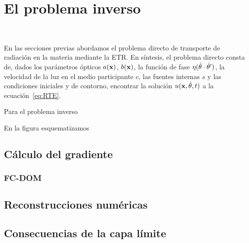 \chapter{El problema inverso}%
\lhead{\thepage}
 \\
\vspace{0.01\textheight}
\label{sec:inverso}

En las secciones previas abordamos el problema directo de transporte 
de radiación en la materia mediante la ETR. En síntesis, el problema 
directo consta de, dados los parámetros ópticos $a(\mathbf{x})$, $b(\mathbf{x})$, la función  
de fase $\eta(\hat{\theta}\cdot \hat{\theta}')$, la velocidad de la luz en el medio participante 
$c$, las fuentes internas $s$ y las condiciones iniciales y de contorno, 
encontrar la solución $u(\mathbf{x},\hat{\theta},t)$ a la ecuación~\eqref{eq:RTE}.

Para el problema inverso

En la figura esquematizamos 
\section{Cálculo del gradiente}


\subsection{FC-DOM}
\section{Reconstrucciones numéricas}
\label{sec:inverseres}
\section{Consecuencias de la capa límite}
